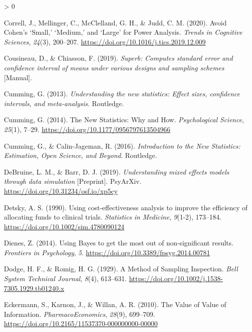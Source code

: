 \documentclass[
  english,
  ,jou,floatsintext]{apa6}
\newlength{\cslhangindent}
\newenvironment{CSLReferences}[2] %
 {%
  \setlength{\parindent}{0pt}
  \ifodd #1 \everypar{\setlength{\hangindent}{\cslhangindent}}\ignorespaces\fi
  \ifnum #2 > 0
  \setlength{\parskip}{#2\baselineskip}
  \fi
 }%
 {}
\begin{document}
\begin{CSLReferences}{1}{0}
\leavevmode\hypertarget{ref-correll_avoid_2020}{}%
Correll, J., Mellinger, C., McClelland, G. H., \& Judd, C. M. (2020). Avoid {Cohen}'s {`{Small},'} {`{Medium},'} and {`{Large}'} for {Power Analysis}. \emph{Trends in Cognitive Sciences}, \emph{24}(3), 200--207. \url{https://doi.org/10.1016/j.tics.2019.12.009}

\leavevmode\hypertarget{ref-cousineau_superb_2019}{}%
Cousineau, D., \& Chiasson, F. (2019). \emph{Superb: {Computes} standard error and confidence interval of means under various designs and sampling schemes} {[}Manual{]}.

\leavevmode\hypertarget{ref-cumming_understanding_2013}{}%
Cumming, G. (2013). \emph{Understanding the new statistics: {Effect} sizes, confidence intervals, and meta-analysis}. {Routledge}.

\leavevmode\hypertarget{ref-cumming_new_2014}{}%
Cumming, G. (2014). The {New Statistics}: {Why} and {How}. \emph{Psychological Science}, \emph{25}(1), 7--29. \url{https://doi.org/10.1177/0956797613504966}

\leavevmode\hypertarget{ref-cumming_introduction_2016}{}%
Cumming, G., \& Calin-Jageman, R. (2016). \emph{Introduction to the {New Statistics}: {Estimation}, {Open Science}, and {Beyond}}. {Routledge}.

\leavevmode\hypertarget{ref-debruine_understanding_2019}{}%
DeBruine, L. M., \& Barr, D. J. (2019). \emph{Understanding mixed effects models through data simulation} {[}Preprint{]}. {PsyArXiv}. \url{https://doi.org/10.31234/osf.io/xp5cy}

\leavevmode\hypertarget{ref-detsky_using_1990}{}%
Detsky, A. S. (1990). Using cost-effectiveness analysis to improve the efficiency of allocating funds to clinical trials. \emph{Statistics in Medicine}, \emph{9}(1-2), 173--184. \url{https://doi.org/10.1002/sim.4780090124}

\leavevmode\hypertarget{ref-dienes_using_2014}{}%
Dienes, Z. (2014). Using {Bayes} to get the most out of non-significant results. \emph{Frontiers in Psychology}, \emph{5}. \url{https://doi.org/10.3389/fpsyg.2014.00781}

\leavevmode\hypertarget{ref-dodge_method_1929}{}%
Dodge, H. F., \& Romig, H. G. (1929). A {Method} of {Sampling Inspection}. \emph{Bell System Technical Journal}, \emph{8}(4), 613--631. \url{https://doi.org/10.1002/j.1538-7305.1929.tb01240.x}

\leavevmode\hypertarget{ref-eckermann_value_2010}{}%
Eckermann, S., Karnon, J., \& Willan, A. R. (2010). The {Value} of {Value} of {Information}. \emph{PharmacoEconomics}, \emph{28}(9), 699--709. \url{https://doi.org/10.2165/11537370-000000000-00000}


\end{CSLReferences}
\end{document}
